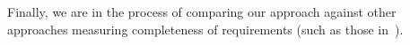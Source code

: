 Finally, we are in the process of
comparing our approach against other approaches measuring completeness of
requirements (such as those in~\cite{chockler_coverage_2003, Kupferman:2006:SCF, kupferman_theory_2008}).
%



